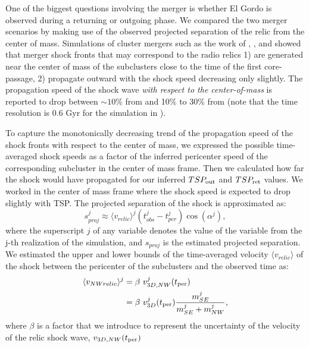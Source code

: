 One of the biggest questions involving the merger is whether El Gordo is
observed during a returning or outgoing phase. We compared the two merger
scenarios by making use of the observed projected separation of the relic from the
center of mass.
Simulations of cluster mergers such as the work of \citet{Paul2011b},
\citet{VanWeerenRJ2011}, and \citet{Springel2007} showed that merger shock
fronts that may correspond to the radio relics 1) are generated near the
center of mass of the subclusters close to the time of the first
core-passage, 2) propagate outward with the shock speed decreasing only slightly.
The propagation speed of the shock wave {\it with respect to the
center-of-mass} is reported 
to drop between $\sim 10\%$ from \citet{Springel2007} and  
10\% to 30\% from \citet{Paul2011b} (note that the   
 time resolution is 0.6 Gyr for the simulation in \citealt{Paul2011b}).
\par 
To capture the monotonically decreasing trend of the
propagation speed of the shock fronts with respect to the center of
mass, we expressed the possible time-averaged shock speeds as a factor of the inferred
pericenter speed of the corresponding subcluster in the center of mass
 frame. 
Then we calculated how far the shock would have propagated for our inferred
$TSP_{\rm out}$ and $TSP_{\rm ret}$ values. We worked in the center of mass frame where the
shock speed is expected to drop slightly with TSP. 
The projected separation of the shock is approximated as:
\begin{equation}
	s^j_{proj} \approx \langle v_{relic} \rangle^j (t^j_{obs} - t^j_{per})
	\cos(\alpha^j),
	\label{eq:proj_s_model}
\end{equation}
where the superscript $j$ of any variable denotes the value of the
variable from the j-th realization of the simulation, and $s_{proj}$ is the estimated projected
separation. We estimated the upper and lower bounds of the time-averaged velocity
$\langle v_{relic} \rangle$ of the shock between
the pericenter of the subclusters and the observed time as:  
\begin{align}
	\label{eqn:NW_speed}
	\langle v_{NW relic} \rangle^j &= \beta~v^j_{3D, NW}(t_{\rm per}) \\
	&= \beta~v^j_{3D}(t_{\rm per}) \frac{m^j_{SE}}{m^j_{SE} + m^j_{NW}}, 
\end{align}
where  $\beta$ is a factor that we introduce to represent the
uncertainty of the velocity of the relic shock wave, $v_{3D, NW}(t_{\rm per})$ 
